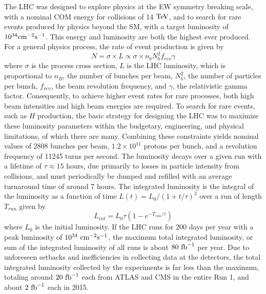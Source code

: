 \indent The LHC was designed to explore physics at the EW symmetry breaking scale, with a nominal COM energy for collisions of 14 $\mathrm{Te\kern -0.1em V}$, and to search for rare events produced by physics beyond the SM, with a target luminosity of $10^{34} \rm{cm}^{-2} \rm{s}^{-1}$. This energy and luminosity are both the highest ever produced. For a general physics process, the rate of event production is given by
\begin{equation}
N = \sigma \times L \propto \sigma \times n_b N_b^2 f_{rev} \gamma
\end{equation}
where $\sigma$ is the process cross section, $L$ is the LHC luminosity, which is proportional to $n_B$, the number of bunches per beam, $N_b^2$, the number of particles per bunch, $f_{rev}$, the beam revolution frequency, and $\gamma$, the relativistic gamma factor. Consequently, to achieve higher event rates for rare processes, both high beam intensities and high beam energies are required. To search for rare events, such as $H$ production, the basic strategy for designing the LHC was to maximize these luminosity parameters within the budgetary, engineering, and physical limitations, of which there are many. Combining these constraints yields nominal values of 2808 bunches per beam, $1.2\times10^{11}$ protons per bunch, and a revolution frequency of 11245 turns per second. The luminosity decays over a given run with a lifetime of $\tau \approx 15$ hours, due primarily to losses in particle intensity from collisions, and must periodically be dumped and refilled with an average turnaround time of around 7 hours. The integrated luminosity is the integral of the luminosity as a function of time $L(t) = L_0 / (1+t/\tau)^2$ over a run of length $T_{run}$ given by
\begin{equation}
L_{int} = L_0 \tau (1-e^{-T_{run}/\tau})
\end{equation}
where $L_0$ is the initial luminosity. If the LHC runs for 200 days per year with a peak luminosity of $10^{34}\ \rm{cm}^{-2} \rm{s}^{-1}$, the maximum total integrated luminosity, or sum of the integrated luminosity of all runs is about $80\ \rm{fb}^{-1}$ per year. Due to unforeseen setbacks and inefficiencies in collecting data at the detectors, the total integrated luminosity collected by the experiments is far less than the maximum, totaling around $20\ \rm{fb}^{-1}$ each from ATLAS and CMS in the entire Run 1, and about $2\ \rm{fb}^{-1}$ each in 2015. 

